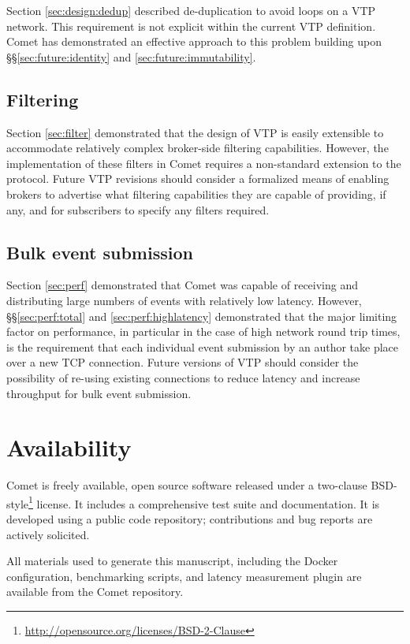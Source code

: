 \documentclass[5p,authoryear]{elsarticle}
\begin{document}
Section \ref{sec:design:dedup} described de-duplication to avoid loops on a
VTP network. This requirement is not explicit within the current VTP
definition. Comet has demonstrated an effective approach to this problem
building upon \S\S\ref{sec:future:identity} and \ref{sec:future:immutability}.

\subsection{Filtering}
\label{sec:future:filter}

Section \ref{sec:filter} demonstrated that the design of VTP is easily
extensible to accommodate relatively complex broker-side filtering
capabilities. However, the implementation of these filters in Comet requires a
non-standard extension to the protocol. Future VTP revisions should consider a
formalized means of enabling brokers to advertise what filtering capabilities
they are capable of providing, if any, and for subscribers to specify any
filters required.

\subsection{Bulk event submission}
\label{sec:future:bulk}

Section \ref{sec:perf} demonstrated that Comet was capable of receiving and
distributing large numbers of events with relatively low latency. However,
\S\S\ref{sec:perf:total} and \ref{sec:perf:highlatency} demonstrated that
the major limiting factor on performance, in particular in the case of high
network round trip times, is the requirement that each individual event
submission by an author take place over a new TCP connection.  Future versions
of VTP should consider the possibility of re-using existing connections to
reduce latency and increase throughput for bulk event submission.

\section{Availability}
\label{sec:avail}

Comet is freely available, open source software released under a two-clause
BSD-style\footnote{\url{http://opensource.org/licenses/BSD-2-Clause}} license.
It includes a comprehensive test suite and documentation. It is developed
using a public code repository; contributions and bug reports are actively
solicited.

All materials used to generate this manuscript, including the Docker
configuration, benchmarking scripts, and latency measurement plugin are
available from the Comet repository.
\end{document}
